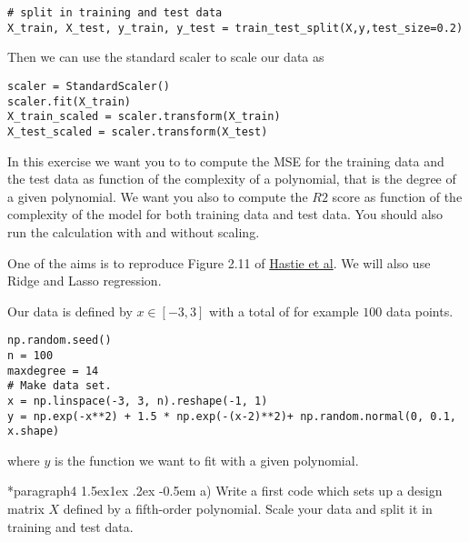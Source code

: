 \documentclass[%
oneside,                 %
final,                   %
10pt]{article}
\makeatletter
\newenvironment{doconceexercise}{}{}
\newcommand\subex{\@startsection*{paragraph}{4}{\z@}%
                  {1.5ex\@plus1ex \@minus.2ex}%
                  {-0.5em}%
                  {\normalfont\normalsize\bfseries}}
\makeatother
\begin{document}
\begin{doconceexercise}
\begin{verbatim}
# split in training and test data
X_train, X_test, y_train, y_test = train_test_split(X,y,test_size=0.2)

\end{verbatim}

Then we can use the standard scaler to scale our data as





\begin{verbatim}
scaler = StandardScaler()
scaler.fit(X_train)
X_train_scaled = scaler.transform(X_train)
X_test_scaled = scaler.transform(X_test)

\end{verbatim}


In this exercise we want you to to compute the MSE for the training
data and the test data as function of the complexity of a polynomial,
that is the degree of a given polynomial. We want you also to compute the $R2$ score as function of the complexity of the model for both training data and test data.  You should also run the calculation with and without scaling. 

One of 
the aims is to reproduce Figure 2.11 of \href{{https://github.com/CompPhysics/MLErasmus/blob/master/doc/Textbooks/elementsstat.pdf}}{Hastie et al}.
We will also use Ridge and Lasso regression. 

Our data is defined by $x\in [-3,3]$ with a total of for example $100$ data points.







\begin{verbatim}
np.random.seed()
n = 100
maxdegree = 14
# Make data set.
x = np.linspace(-3, 3, n).reshape(-1, 1)
y = np.exp(-x**2) + 1.5 * np.exp(-(x-2)**2)+ np.random.normal(0, 0.1, x.shape)

\end{verbatim}

where $y$ is the function we want to fit with a given polynomial.

\subex{a)}
Write a first code which sets up a design matrix $X$ defined by a fifth-order polynomial.  Scale your data and split it in training and test data.


\end{doconceexercise}
\end{document}

